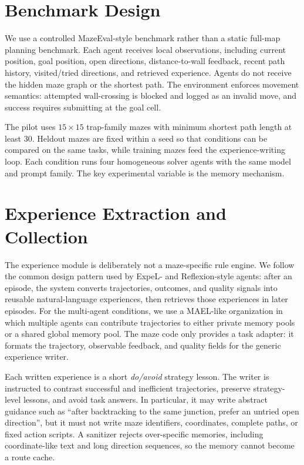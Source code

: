 \documentclass[11pt]{article}
\begin{document}
\section{Benchmark Design}

We use a controlled MazeEval-style benchmark rather than a static full-map planning benchmark. Each agent receives local observations, including current position, goal position, open directions, distance-to-wall feedback, recent path history, visited/tried directions, and retrieved experience. Agents do not receive the hidden maze graph or the shortest path. The environment enforces movement semantics: attempted wall-crossing is blocked and logged as an invalid move, and success requires submitting at the goal cell.

The pilot uses $15 \times 15$ trap-family mazes with minimum shortest path length at least 30. Heldout mazes are fixed within a seed so that conditions can be compared on the same tasks, while training mazes feed the experience-writing loop. Each condition runs four homogeneous solver agents with the same model and prompt family. The key experimental variable is the memory mechanism.

\section{Experience Extraction and Collection}

The experience module is deliberately not a maze-specific rule engine. We follow the common design pattern used by ExpeL- and Reflexion-style agents: after an episode, the system converts trajectories, outcomes, and quality signals into reusable natural-language experiences, then retrieves those experiences in later episodes. For the multi-agent conditions, we use a MAEL-like organization in which multiple agents can contribute trajectories to either private memory pools or a shared global memory pool. The maze code only provides a task adapter: it formats the trajectory, observable feedback, and quality fields for the generic experience writer.

Each written experience is a short \emph{do/avoid} strategy lesson. The writer is instructed to contrast successful and inefficient trajectories, preserve strategy-level lessons, and avoid task answers. In particular, it may write abstract guidance such as ``after backtracking to the same junction, prefer an untried open direction'', but it must not write maze identifiers, coordinates, complete paths, or fixed action scripts. A sanitizer rejects over-specific memories, including coordinate-like text and long direction sequences, so the memory cannot become a route cache.
\end{document}
